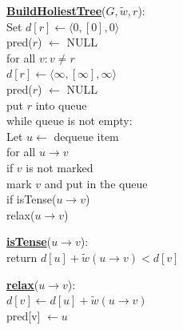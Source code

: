 \documentclass{article}
\begin{document}
\begin{minipage}[t]{0.48\linewidth}
\begin{algorithm}
\textbf{\underline{BuildHoliestTree}}($G, \tilde w , r$): \\ \quad
Set $d[r] \leftarrow \langle 0, [0], 0 \rangle$ \\ \quad \quad
    pred($r$) $\leftarrow$ NULL \\ \quad
for all $v : v \neq r$ \\ \quad \quad
    $d[r] \leftarrow \langle \infty, [\infty], \infty \rangle$ \\ \quad \quad
    pred($r$) $\leftarrow$ NULL \\ \quad
put $r$ into queue \\ \quad
while queue is not empty: \\ \quad \quad
    Let $u \leftarrow$ dequeue item \\ \quad \quad
    for all $u \rightarrow v$ \\ \qquad \quad
        if $v$ is not marked \\ \quad \qquad \quad
           mark $v$ and put in the queue \\ \qquad \quad
        if isTense($u \rightarrow v$) \\ \quad \qquad \quad
           relax($u \rightarrow v$)
\end{algorithm}
\end{minipage}
\hfill%
\hspace{-4cm}
\begin{minipage}[t]{0.48\linewidth}
\begin{algorithm}
\textbf{\underline{isTense}}($u \rightarrow v$): \\ \quad
return $d[u] + \tilde w(u \rightarrow v) < d[v]$ \\

\end{algorithm}

\vspace{0.5cm}

\begin{algorithm}
\textbf{\underline{relax}}($u \rightarrow v$): \\ \quad
$d[v] \leftarrow d[u] + \tilde w(u \rightarrow v)$ \\ \quad
pred[v] $\leftarrow u$ \\
\end{algorithm}
\end{minipage}

\vspace{0.5cm}
\end{document}
